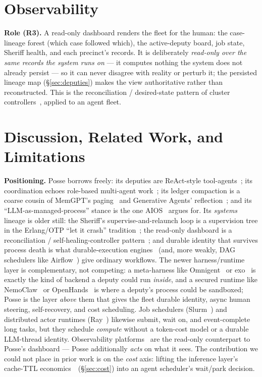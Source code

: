 \documentclass[10pt,twocolumn]{article}
\begin{document}
\section{Observability}
\label{sec:dash}
\textbf{Role (R3).} A read-only dashboard renders the fleet for the human: the
case-lineage forest (which case followed which), the active-deputy board, job state,
Sheriff health, and each precinct's records. It is deliberately \emph{read-only over the
same records the system runs on} --- it computes nothing the system does not already
persist --- so it can never disagree with reality or perturb it; the persisted lineage
map (\S\ref{sec:deputies}) makes the view authoritative rather than reconstructed. This
is the reconciliation / desired-state pattern of cluster controllers~\cite{borg,k8s},
applied to an agent fleet.

\section{Discussion, Related Work, and Limitations}
\label{sec:related}
\textbf{Positioning.} Posse borrows freely: its deputies are ReAct-style
tool-agents~\cite{react}; its coordination echoes role-based multi-agent
work~\cite{autogen,metagpt,crewai}; its ledger compaction is a coarse cousin of MemGPT's
paging~\cite{memgpt} and Generative Agents' reflection~\cite{genagents}; and its
``LLM-as-managed-process'' stance is the one AIOS~\cite{aios} argues for. Its
\emph{systems} lineage is older still: the Sheriff's supervise-and-relaunch loop is a
supervision tree in the Erlang/OTP ``let it crash'' tradition~\cite{otp,actor}; the
read-only dashboard is a reconciliation / self-healing-controller pattern~\cite{borg,k8s};
and durable identity that survives process death is what durable-execution
engines~\cite{temporal,stepfns} (and, more weakly, DAG schedulers like
Airflow~\cite{airflow}) give ordinary workflows. The newer harness/runtime layer is complementary, not
competing: a meta-harness like Omnigent~\cite{omnigent} or exo~\cite{exo} is exactly the
kind of backend a deputy could run \emph{inside}, and a secured runtime like
NemoClaw~\cite{nemoclaw} or OpenHands~\cite{openhands} is where a deputy's process could
be sandboxed; Posse is the layer \emph{above} them that gives the fleet durable identity,
async human steering, self-recovery, and cost scheduling. Job schedulers
(Slurm~\cite{slurm}) and distributed actor runtimes (Ray~\cite{ray}) likewise submit,
wait on, and event-complete long tasks, but they schedule \emph{compute} without a
token-cost model or a durable LLM-thread identity. Observability
platforms~\cite{langfuse,agentops,phoenix} are the read-only counterpart to Posse's
dashboard --- Posse additionally \emph{acts} on what it sees. The contribution we could
not place in prior work is on the \emph{cost} axis: lifting the inference layer's
cache-TTL economics~\cite{vllm,sglang}~(\S\ref{sec:cost}) into an agent scheduler's
wait/park decision.
\end{document}
